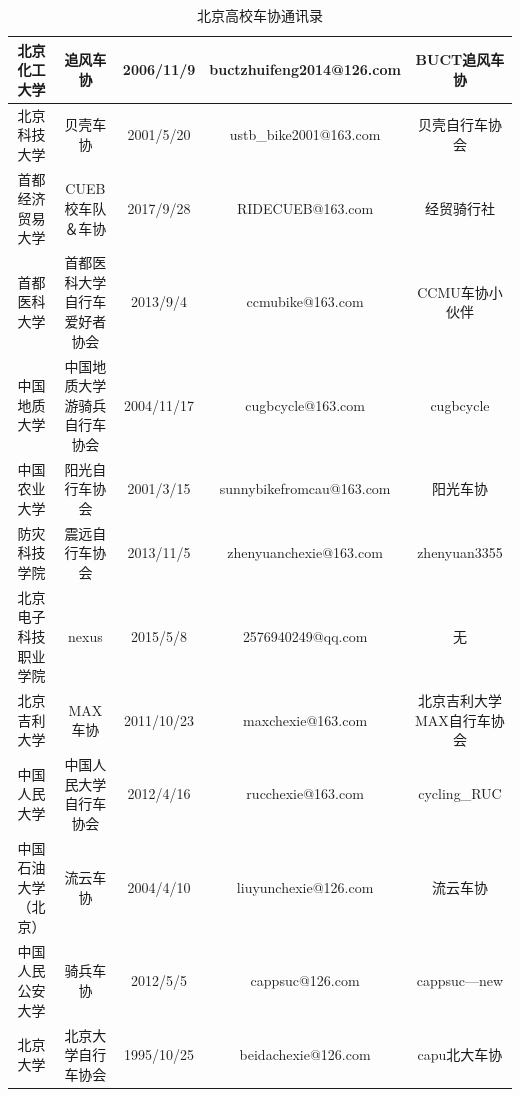 \documentclass{ctexbook}
\begin{document}
\begin{table}[H]
\begin{tabular}{|c|c|c|c|c|}
        北京化工大学 & 追风车协 & 2006/11/9 & buctzhuifeng2014@126.com & BUCT追风车协 \\ \hline
        北京科技大学 & 贝壳车协 & 2001/5/20 & ustb\_bike2001@163.com  & 贝壳自行车协会 \\ \hline
        首都经济贸易大学 & CUEB校车队＆车协 & 2017/9/28 & RIDECUEB@163.com & 经贸骑行社 \\ \hline
        首都医科大学 & 首都医科大学自行车爱好者协会 & 2013/9/4 & ccmubike@163.com & CCMU车协小伙伴 \\ \hline
        中国地质大学 & 中国地质大学游骑兵自行车协会 & 2004/11/17 & cugbcycle@163.com & cugbcycle \\ \hline
        中国农业大学 & 阳光自行车协会 & 2001/3/15 & sunnybikefromcau@163.com & 阳光车协 \\ \hline
        防灾科技学院 & 震远自行车协会 & 2013/11/5 & zhenyuanchexie@163.com & zhenyuan3355 \\ \hline
        北京电子科技职业学院 & nexus & 2015/5/8 & 2576940249@qq.com & 无 \\ \hline
        北京吉利大学 & MAX车协 & 2011/10/23 & maxchexie@163.com & 北京吉利大学MAX自行车协会 \\ \hline
        中国人民大学 & 中国人民大学自行车协会 & 2012/4/16 & rucchexie@163.com & cycling\_RUC \\ \hline
        中国石油大学（北京） & 流云车协 & 2004/4/10 & liuyunchexie@126.com & 流云车协 \\ \hline
        中国人民公安大学 & 骑兵车协 & 2012/5/5 & cappsuc@126.com & cappsuc—new \\ \hline
        北京大学 & 北京大学自行车协会 & 1995/10/25 & beidachexie@126.com & capu北大车协 \\ \hline
    \end{tabular}
    \caption{北京高校车协通讯录}
    \label{tab:北京高校车协通讯录}
\end{table}
\clearpage
\end{document}
